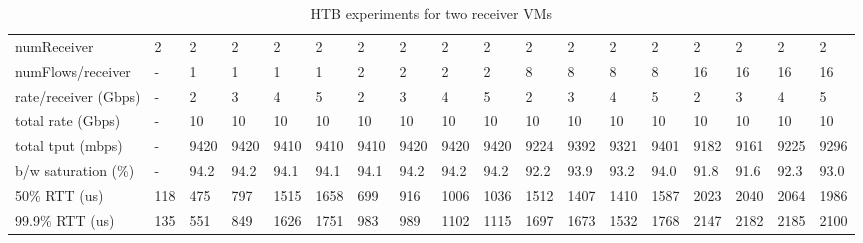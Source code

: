 \begin{table*}[!tb]
\centering

{\setlength{\tabcolsep}{1pt}
\begin{tabular}{|l|l|llll|llll|llll|llll|}
\hline
numReceiver          & 2   & 2    & 2    & 2    & 2    & 2    & 2    & 2    & 2    & 2     & 2     & 2     & 2     & 2     & 2     & 2     & 2     \\
numFlows/receiver    & -   & 1    & 1    & 1    & 1    & 2    & 2    & 2    & 2    & 8     & 8     & 8     & 8     & 16    & 16    & 16    & 16    \\
rate/receiver (Gbps) & -   & 2    & 3    & 4    & 5    & 2    & 3    & 4    & 5    & 2     & 3     & 4     & 5     & 2     & 3     & 4     & 5     \\
total rate (Gbps)    & -   & 10   & 10   & 10   & 10   & 10   & 10   & 10   & 10   & 10    & 10    & 10    & 10    & 10    & 10    & 10    & 10    \\
\hline
total tput (mbps)    & -   & 9420 & 9420 & 9410 & 9410 & 9410 & 9420 & 9420 & 9420 & 9224  & 9392  & 9321  & 9401  & 9182  & 9161  & 9225  & 9296  \\
b/w saturation (\%)  & -   & 94.2 & 94.2 & 94.1 & 94.1 & 94.1 & 94.2 & 94.2 & 94.2 & 92.2  & 93.9  & 93.2  & 94.0  & 91.8  & 91.6  & 92.3  & 93.0 \\ \hline
50\% RTT (us)        & 118 & 475  & 797  & 1515 & 1658 & 699  & 916  & 1006 & 1036 & 1512  & 1407  & 1410  & 1587  & 2023  & 2040  & 2064  & 1986  \\
99.9\% RTT (us)      & 135 & 551  & 849  & 1626 & 1751 & 983  & 989  & 1102 & 1115 & 1697  & 1673  & 1532  & 1768  & 2147  & 2182  & 2185  & 2100 \\
\hline
\end{tabular}}
\caption{HTB experiments for two receiver VMs}
\label{tbl:htb-2rec} 
\end{table*}

